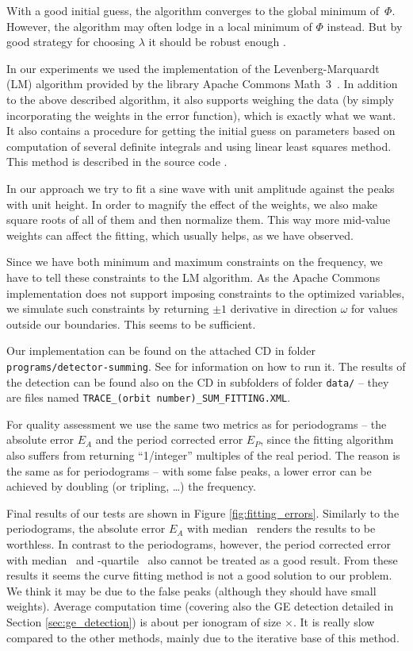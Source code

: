 With a good initial guess, the algorithm converges to the global minimum of~$\Phi$. However, the algorithm may often lodge in a local minimum of $\Phi$ instead. But by good strategy for choosing $\lambda$ it should be robust enough \citep[pp.~437--428]{Marquardt1963}.

In our experiments we used the implementation of the Levenberg-Marquardt (LM) algorithm provided by the library Apache Commons Math~3~\citep{Apache2013}. In addition to the above described algorithm, it also supports weighing the data (by simply incorporating the weights in the error function), which is exactly what we want. It also contains a procedure for getting the initial guess on parameters based on computation of several definite integrals and using linear least squares method. This method is described in the source code \citep{math3}.

In our approach we try to fit a sine wave with unit amplitude against the peaks with unit height. In order to magnify the effect of the weights, we also make square roots of all of them and then normalize them. This way more mid-value weights can affect the fitting, which usually helps, as we have observed.

Since we have both minimum and maximum constraints on the frequency, we have to tell these constraints to the LM algorithm. As the Apache Commons implementation does not support imposing constraints to the optimized variables, we simulate such constraints by returning $\pm1$ derivative in direction $\omega$ for values outside our boundaries. This seems to be sufficient.

Our implementation can be found on the attached CD in folder \texttt{programs/detector-summing}. See  for information on how to run it. The results of the detection can be found also on the CD in subfolders of folder \texttt{data/} -- they are files named \texttt{TRACE\_(orbit number)\_SUM\_FITTING.XML}.

For quality assessment we use the same two metrics as for periodograms -- the absolute error $E_A$ and the period corrected error $E_P$, since the fitting algorithm also suffers from returning ``1/integer'' multiples of the real period. The reason is the same as for periodograms -- with some false peaks, a lower error can be achieved by doubling (or tripling, \ldots) the frequency.   

Final results of our tests are shown in Figure \ref{fig:fitting_errors}. Similarly to the periodograms, the absolute error $E_A$ with median~ renders the results to be worthless. In contrast to the periodograms, however, the period corrected error with median~ and \mbox{-quartile}~ also cannot be treated as a good result. From these results it seems the curve fitting method is not a good solution to our problem. We think it may be due to the false peaks (although they should have small weights). Average computation time (covering also the GE detection detailed in Section \ref{sec:ge_detection}) is about  per ionogram of size $\times$. It is really slow compared to the other methods, mainly due to the iterative base of this method.

